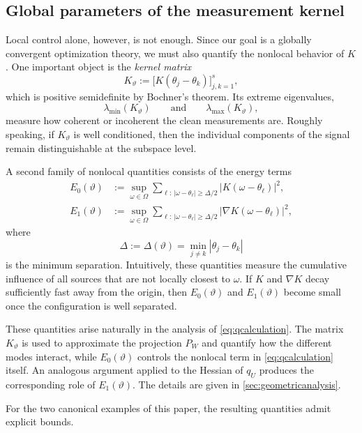 \documentclass[11pt]{article}
\theoremstyle{definition}
\numberwithin{theorem}{section}
\numberwithin{lemma}{section}
\numberwithin{equation}{section}
\numberwithin{equation}{section}
\begin{document}
\subsection{Global parameters of the measurement kernel}
Local control alone, however, is not enough. Since our goal is a globally convergent optimization theory, we must also quantify the nonlocal behavior of $K$. One important object is the \emph{kernel matrix}
\begin{equation}
\label{eq:kernelmatrix}
K_\vartheta
:=
\bigl[K(\theta_j-\theta_k)\bigr]_{j,k=1}^s,
\end{equation}
which is positive semidefinite by Bochner's theorem. Its extreme eigenvalues,
\[
\lambda_{\min}(K_\vartheta)
\qquad\text{and}\qquad
\lambda_{\max}(K_\vartheta),
\]
measure how coherent or incoherent the clean measurements are. Roughly speaking, if $K_\vartheta$ is well conditioned, then the individual components of the signal remain distinguishable at the subspace level.

A second family of nonlocal quantities consists of the energy terms
\begin{align}
E_0(\vartheta)
&:=
\sup_{\omega\in\Omega}
\sum_{\ell:\,|\omega-\theta_\ell|\ge \Delta/2}
|K(\omega-\theta_\ell)|^2,
\label{eq:E0def}
\\
E_1(\vartheta)
&:=
\sup_{\omega\in\Omega}
\sum_{\ell:\,|\omega-\theta_\ell|\ge \Delta/2}
|\nabla K(\omega-\theta_\ell)|^2,
\label{eq:E1def}
\end{align}
where
\[
\Delta:=\Delta(\vartheta)=\min_{j\neq k}|\theta_j-\theta_k|
\]
is the minimum separation. Intuitively, these quantities measure the cumulative influence of all sources that are not locally closest to $\omega$. If $K$ and $\nabla K$ decay sufficiently fast away from the origin, then $E_0(\vartheta)$ and $E_1(\vartheta)$ become small once the configuration is well separated.

These quantities arise naturally in the analysis of \eqref{eq:qcalculation}. The matrix $K_\vartheta$ is used to approximate the projection $P_W$ and quantify how the different modes interact, while $E_0(\vartheta)$ controls the nonlocal term in \eqref{eq:qcalculation} itself. An analogous argument applied to the Hessian of $q_U$ produces the corresponding role of $E_1(\vartheta)$. The details are given in \cref{sec:geometricanalysis}.

For the two canonical examples of this paper, the resulting quantities admit explicit bounds.
\end{document}
